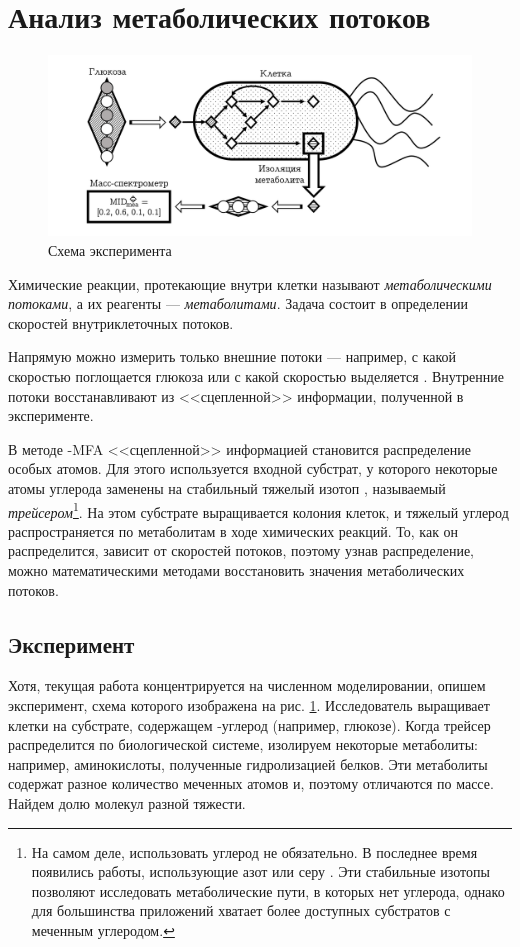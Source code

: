 \documentclass[14pt, a4paper]{extreport}
\begin{document}
\section{Анализ метаболических потоков}
\begin{figure}[t]
	\includegraphics[width=1\textwidth]{experiment.png}\par
	\caption{Схема эксперимента}
	\label{experiment}
\end{figure}
Химические реакции, протекающие внутри клетки называют \emph{метаболическими потоками}, а их реагенты --- \emph{метаболитами}. Задача состоит в определении скоростей внутриклеточных потоков. 

Напрямую можно измерить только внешние потоки --- например, с какой скоростью поглощается глюкоза или с какой скоростью выделяется . Внутренние потоки восстанавливают из <<сцепленной>> информации, полученной в эксперименте. 

В методе -MFA <<сцепленной>> информацией становится распределение особых атомов. Для этого используется входной субстрат, у которого некоторые атомы углерода заменены на стабильный тяжелый изотоп , называемый \emph{трейсером}\footnote{На самом деле, использовать углерод не обязательно. В последнее время появились работы, использующие  азот \cite{nitrogen_mfa} или  серу \cite{sulfur_mfa}. Эти стабильные изотопы позволяют исследовать метаболические пути, в которых нет углерода, однако для большинства приложений хватает более доступных субстратов с меченным углеродом.}.
На этом субстрате выращивается колония клеток, и тяжелый углерод распространяется по метаболитам в ходе химических реакций. То, как он распределится, зависит от скоростей потоков, поэтому узнав распределение, можно математическими методами восстановить значения метаболических потоков.



\subsection{Эксперимент}
Хотя, текущая работа концентрируется на численном моделировании, опишем эксперимент\cite[стр. 312]{protocol}, схема которого изображена на рис. \ref{experiment}. Исследователь выращивает клетки на субстрате, содержащем -углерод (например, глюкозе). Когда трейсер распределится по биологической системе, изолируем некоторые метаболиты: например, аминокислоты, полученные гидролизацией белков. Эти метаболиты содержат разное количество меченных атомов и, поэтому отличаются по массе. Найдем долю молекул разной тяжести. 
\end{document}
